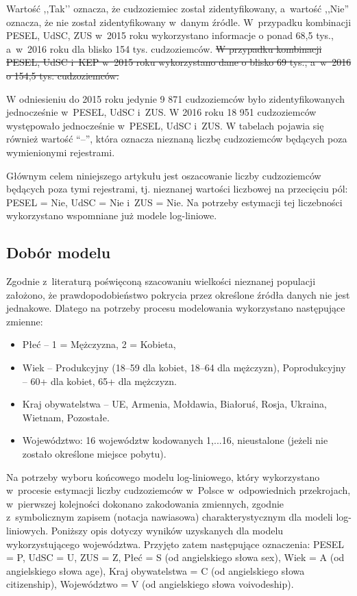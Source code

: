 \documentclass[12pt,a4paper]{article}
\providecommand{\DIFdel}[1]{{\protect\color{red}\sout{#1}}}                      %
\providecommand{\DIFdelbegin}{} %
\providecommand{\DIFdelend}{} %
\begin{document}
Wartość ,,Tak’’ oznacza, że cudzoziemiec został zidentyfikowany, a~wartość ,,Nie” oznacza, że nie został zidentyfikowany w~danym źródle. W~przypadku kombinacji PESEL, UdSC, ZUS w~2015 roku wykorzystano informacje o ponad 68,5 tys., a~w~2016 roku dla blisko 154 tys. cudzoziemców. 
\DIFdelbegin \DIFdel{W przypadku kombinacji PESEL, UdSC i~KEP w~2015 roku wykorzystano dane o blisko 69 tys., a~w~2016 o 154,5 tys. cudzoziemców. 
}\DIFdelend 

W odniesieniu do 2015 roku jedynie 9 871 cudzoziemców było zidentyfikowanych jednocześnie w~PESEL, UdSC i~ZUS. W 2016 roku 18 951 cudzoziemców występowało jednocześnie w~PESEL, UdSC i~ZUS. W tabelach pojawia się również wartość “--”, która oznacza nieznaną liczbę cudzoziemców będących poza wymienionymi rejestrami. 

Głównym celem niniejszego artykułu jest oszacowanie liczby cudzoziemców będących poza tymi rejestrami, tj. nieznanej wartości liczbowej na przecięciu pól: PESEL = Nie, UdSC = Nie i~ZUS = Nie. Na potrzeby estymacji tej liczebności wykorzystano wspomniane już modele log-liniowe.

\begin{center}
\subsection*{Dobór modelu}    
\end{center}

Zgodnie z~literaturą  poświęconą szacowaniu wielkości nieznanej populacji założono, że prawdopodobieństwo pokrycia przez określone źródła danych nie jest jednakowe. Dlatego na potrzeby procesu modelowania wykorzystano następujące zmienne:

\begin{itemize}
    \item Płeć -- 	1 = Mężczyzna, 2 = Kobieta,
    \item Wiek -- Produkcyjny (18--59 dla kobiet, 18--64 dla mężczyzn), Poprodukcyjny – 60+ dla kobiet, 65+ dla mężczyzn.
    \item Kraj obywatelstwa -- UE, Armenia, Mołdawia, Białoruś, Rosja, Ukraina, Wietnam, Pozostałe.
    \item Województwo: 16 województw kodowanych 1,...16, nieustalone (jeżeli nie zostało określone miejsce pobytu).
\end{itemize}

Na potrzeby wyboru końcowego modelu log-liniowego, który wykorzystano w~procesie estymacji liczby cudzoziemców w~Polsce w~odpowiednich przekrojach, w~pierwszej kolejności dokonano zakodowania zmiennych, zgodnie z~symbolicznym zapisem (notacja nawiasowa) charakterystycznym dla modeli log-liniowych. Poniższy opis dotyczy wyników uzyskanych dla modelu wykorzystującego województwa. Przyjęto zatem następujące oznaczenia:  PESEL = P, UdSC = U, ZUS  = Z, Płeć = S (od angielskiego słowa sex), Wiek = A (od angielskiego słowa age), Kraj obywatelstwa = C (od angielskiego słowa citizenship), Województwo = V (od angielskiego słowa voivodeship).
\end{document}
